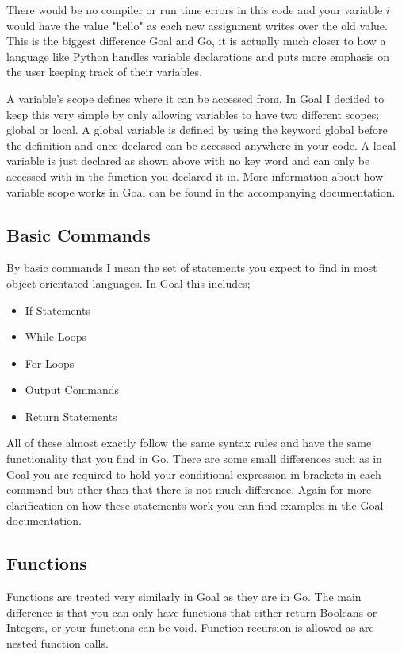 There would be no compiler or run time errors in this code and your variable $i$ would have the value "hello" as each new assignment writes over the old value. This is the biggest difference Goal and Go, it is actually much closer to how a language like Python handles variable declarations and puts more emphasis on the user keeping track of their variables.

A variable's scope defines where it can be accessed from. In Goal I decided to keep this very simple by only allowing variables to have two different scopes; global or local. A global variable is defined by using the keyword global before the definition and once declared can be accessed anywhere in your code. A local variable is just declared as shown above with no key word and can only be accessed with in the function you declared it in. More information about how variable scope works in Goal can be found in the accompanying documentation.     


\subsection{Basic Commands}

By basic commands I mean the set of statements you expect to find in most object orientated languages. In Goal this includes;

\begin{itemize}
	\item If Statements
	\item While Loops
	\item For Loops
	\item Output Commands
	\item Return Statements 
\end{itemize}

All of these almost exactly follow the same syntax rules and have the same functionality that you find in Go. There are some small differences such as in Goal you are required to hold your conditional expression in brackets in each command but other than that there is not much difference. Again for more clarification on how these statements work you can find examples in the Goal documentation.

\subsection{Functions}

Functions are treated very similarly in Goal as they are in Go. The main difference is that you can only have functions that either return Booleans or Integers, or your functions can be void. Function recursion is allowed as are nested function calls.

